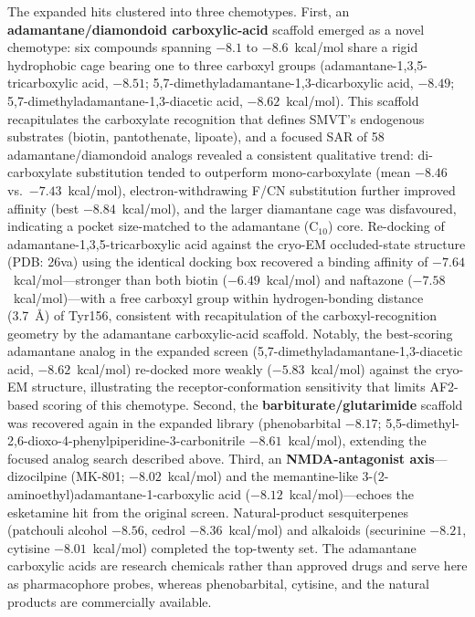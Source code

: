 \documentclass[pdflatex,sn-nature]{sn-jnl}
\begin{document}
The expanded hits clustered into three chemotypes. First, an \textbf{adamantane/diamondoid carboxylic-acid} scaffold emerged as a novel chemotype: six compounds spanning $-8.1$ to $-8.6$~kcal/mol share a rigid hydrophobic cage bearing one to three carboxyl groups (adamantane-1,3,5-tricarboxylic acid, $-8.51$; 5,7-dimethyladamantane-1,3-dicarboxylic acid, $-8.49$; 5,7-dimethyladamantane-1,3-diacetic acid, $-8.62$~kcal/mol). This scaffold recapitulates the carboxylate recognition that defines SMVT's endogenous substrates (biotin, pantothenate, lipoate), and a focused SAR of 58 adamantane/diamondoid analogs revealed a consistent qualitative trend: di-carboxylate substitution tended to outperform mono-carboxylate (mean $-8.46$ vs.\ $-7.43$~kcal/mol), electron-withdrawing F/CN substitution further improved affinity (best $-8.84$~kcal/mol), and the larger diamantane cage was disfavoured, indicating a pocket size-matched to the adamantane (C$_{10}$) core. Re-docking of adamantane-1,3,5-tricarboxylic acid against the cryo-EM occluded-state structure (PDB: 26va) using the identical docking box recovered a binding affinity of $-7.64$~kcal/mol---stronger than both biotin ($-6.49$~kcal/mol) and naftazone ($-7.58$~kcal/mol)---with a free carboxyl group within hydrogen-bonding distance (3.7~\AA{}) of Tyr156, consistent with recapitulation of the carboxyl-recognition geometry by the adamantane carboxylic-acid scaffold. Notably, the best-scoring adamantane analog in the expanded screen (5,7-dimethyladamantane-1,3-diacetic acid, $-8.62$~kcal/mol) re-docked more weakly ($-5.83$~kcal/mol) against the cryo-EM structure, illustrating the receptor-conformation sensitivity that limits AF2-based scoring of this chemotype. Second, the \textbf{barbiturate/glutarimide} scaffold was recovered again in the expanded library (phenobarbital $-8.17$; 5,5-dimethyl-2,6-dioxo-4-phenylpiperidine-3-carbonitrile $-8.61$~kcal/mol), extending the focused analog search described above. Third, an \textbf{NMDA-antagonist axis}---dizocilpine (MK-801; $-8.02$~kcal/mol) and the memantine-like 3-(2-aminoethyl)adamantane-1-carboxylic acid ($-8.12$~kcal/mol)---echoes the esketamine hit from the original screen. Natural-product sesquiterpenes (patchouli alcohol $-8.56$, cedrol $-8.36$~kcal/mol) and alkaloids (securinine $-8.21$, cytisine $-8.01$~kcal/mol) completed the top-twenty set. The adamantane carboxylic acids are research chemicals rather than approved drugs and serve here as pharmacophore probes, whereas phenobarbital, cytisine, and the natural products are commercially available.
\end{document}
